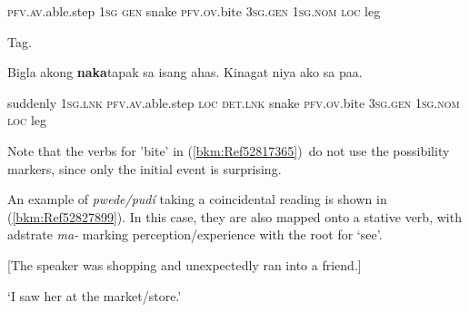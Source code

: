 \begin{stylelsIMT}
\textsc{pfv.av.}able.step\textsc{ 1sg gen }snake\textsc{ pfv.ov.}bite\textsc{ }3\textsc{sg.gen }1\textsc{sg.nom loc }leg
\end{stylelsIMT}

\begin{listWWNumiileveli}
\item 
\begin{listWWNumiilevelii}
\item 
\begin{stylelsLanginfo}
Tag.
\end{stylelsLanginfo}
\end{listWWNumiilevelii}
\end{listWWNumiileveli}
\begin{stylelsSourceline}
Bigla akong \textbf{naka}tapak sa isang ahas. Kinagat niya ako sa paa.
\end{stylelsSourceline}

\begin{stylelsIMT}
suddenly \textsc{1sg.lnk pfv.av.}able.step \textsc{loc det.lnk} snake \textsc{pfv}.\textsc{ov.}bite 3\textsc{sg.gen }1\textsc{sg.nom loc} leg
\end{stylelsIMT}

\begin{styleStandard}
Note that the verbs for 'bite' in (\ref{bkm:Ref52817365})\ do not use the possibility markers, since only the initial event is surprising.
\end{styleStandard}

\begin{styleStandard}
An example of \textit{pwede/pud\'{i}} taking a coincidental reading is shown in (\ref{bkm:Ref52827899}). In this case, they are also mapped onto a stative verb, with adstrate \textit{ma-} marking perception/experience with the root for ‘see’.
\end{styleStandard}

\begin{listWWNumiileveli}
\item 
\begin{stylelsLanginfo}
\label{bkm:Ref52827899}[The speaker was shopping and unexpectedly ran into a friend.]
\end{stylelsLanginfo}
\end{listWWNumiileveli}
\begin{stylelsLanginfo}
‘I saw her at the market/store.’
\end{stylelsLanginfo}

